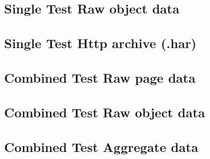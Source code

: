 \subsection{Single Test Raw object data}

\subsection{Single Test Http archive (.har)}

\subsection{Combined Test Raw page data}

\subsection{Combined Test Raw object data}

\subsection{Combined Test Aggregate data}